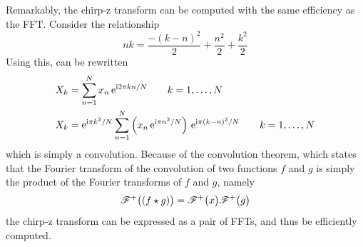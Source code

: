 Remarkably, the chirp-z transform can be computed with the same efficiency
as the FFT.  Consider the relationship
\begin{equation}
n k = \frac{-(k-n)^2}{2} + \frac{n^2}{2} + \frac{k^2}{2}
\end{equation}
Using this,  can be rewritten
\begin{align}
								X_k &= \sum_{n=1}^{N} x_n\, {\mathrm{e}}^{{\mathrm{i}} 2\pi k n/N} \qquad k=1,\ldots,N\\
								X_k &= {\mathrm{e}}^{{\mathrm{i}} \pi k^2/N} \sum_{n=1}^{N} \left(x_n\, {\mathrm{e}}^{{\mathrm{i}} \pi n^2/N}\right)\,
								{\mathrm{e}}^{{\mathrm{i}} \pi(k-n)^2/N}\qquad k=1,\ldots,N\\
\end{align}
which is simply a convolution.  Because of the convolution theorem, which
states that the Fourier transform of the
convolution of two functions $f$ and $g$ is simply the product of the
Fourier transforms of $f$ and $g$, namely
\begin{equation}
{\mathscr{F}^{+}\bigl(\left(f \star g\right)\bigr)} = {\mathscr{F}^{+}\bigl(x\bigr)}{\mathscr{F}^{+}\bigl(g\bigr)}
\end{equation}
the chirp-z transform can be expressed as a pair of FFTs, and thus be
efficiently computed.
